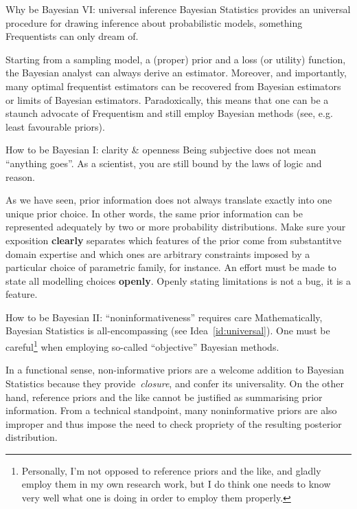 \begin{frame}{Why be Bayesian VI: universal inference}
Bayesian Statistics provides an universal procedure for drawing inference about probabilistic models, something Frequentists can only dream of.
\begin{idea}
Starting from a sampling model, a (proper) prior and a loss (or utility) function, the Bayesian analyst can always derive an estimator.
Moreover, and importantly, many optimal frequentist estimators can be recovered from Bayesian estimators or limits of Bayesian estimators.
Paradoxically, this means that one can be a staunch advocate of Frequentism and still employ Bayesian methods (see, e.g. least favourable priors). 
 \label{id:universal}
\end{idea}
\end{frame}
\begin{frame}{How to be Bayesian I: clarity \& openness}
Being subjective does not mean ``anything goes''.
As a scientist, you are still bound by the laws of logic and reason.

\begin{idea}
 As we have seen, prior information does not always translate exactly into one unique prior choice.
 In other words, the same prior information can be represented adequately by two or more probability distributions.
 Make sure your exposition \textbf{clearly} separates which features of the prior come from substantitve domain expertise and which ones are arbitrary constraints imposed by a particular choice of parametric family, for instance.
 An effort must be made to state all modelling choices \textbf{openly}.
 Openly stating limitations is not a bug, it is a feature.
 \end{idea}
\end{frame}
\begin{frame}{How to be Bayesian II: ``noninformativeness'' requires care}
Mathematically, Bayesian Statistics is all-encompassing (see Idea~\ref{id:universal}).
One must be careful\footnote{Personally, I'm not opposed to reference priors and the like, and gladly employ them in my own research work, but I do think one needs to know very well what one is doing in order to employ them properly.} when employing so-called ``objective'' Bayesian methods.
\begin{idea}
 \label{id:careful}
 In a functional sense, non-informative priors are a welcome addition to Bayesian Statistics because they provide~\textit{closure}, and confer its universality.
 On the other hand, reference priors and the like cannot be justified as summarising prior information.
 From a technical standpoint, many noninformative priors are also improper and thus impose the need to check propriety of the resulting posterior distribution.
\end{idea}
 \end{frame}
